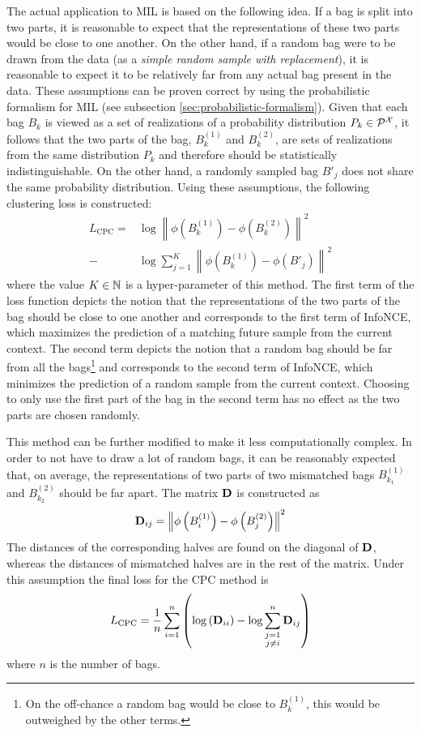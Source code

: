 The actual application to MIL is based on the following idea. If a bag is split into two parts, it is reasonable to expect that the representations of these two parts would be close to one another. On the other hand, if a random bag were to be drawn from the data (as a \textit{simple random sample with replacement}), it is reasonable to expect it to be relatively far from any actual bag present in the data. These assumptions can be proven correct by using the probabilistic formalism for MIL (see subsection \ref{sec:probabilistic-formalism}). Given that each bag \( B_k \) is viewed as a set of realizations of a probability distribution \( P_k \in \mathcal{P}^\mathspace{X} \), it follows that the two parts of the bag, \( B_k^{(1)} \) and \( B_k^{(2)} \), are sets of realizations from the same distribution \( P_k \) and therefore should be statistically indistinguishable. On the other hand, a randomly sampled bag \( B'_j \) does not share the same probability distribution.
Using these assumptions, the following clustering loss is constructed:
\begin{align*}
	L_\mathrm{CPC} = &\log \left\lVert \phi \left( B_k^{(1)} \right) - \phi \left( B_k^{(2)} \right) \right\rVert^2 \\
	- &\log \sum_{j = 1}^K \left\lVert \phi \left( B_k^{(1)} \right) - \phi \left( B'_j \right) \right\rVert^2
\end{align*}
where the value \( K \in \mathbb{N} \) is a hyper-parameter of this method. The first term of the loss function depicts the notion that the representations of the two parts of the bag should be close to one another and corresponds to the first term of InfoNCE, which maximizes the prediction of a matching future sample from the current context. The second term depicts the notion that a random bag should be far from all the bags\footnote{On the off-chance a random bag would be close to \( B_k^{(1)} \), this would be outweighed by the other terms.} and corresponds to the second term of InfoNCE, which minimizes the prediction of a random sample from the current context. Choosing to only use the first part of the bag in the second term has no effect as the two parts are chosen randomly.

This method can be further modified to make it less computationally complex. In order to not have to draw a lot of random bags, it can be reasonably expected that, on average, the representations of two parts of two mismatched bags \( B_{k_1}^{(1)} \) and \( B_{k_2}^{(2)} \) should be far apart. The matrix \( \mathbf{D} \) is constructed as
\begin{equation}\label{eq:bag-distance-matrix}
	\mathbf{D}_{ij} = \left\lVert \phi \left( B_i^{(1)} \right) - \phi \left( B_j^{(2)} \right) \right\rVert^2
\end{equation}
The distances of the corresponding halves are found on the diagonal of \( \mathbf{D} \), whereas the distances of mismatched halves are in the rest of the matrix. Under this assumption the final loss for the CPC method is
\[ L_\mathrm{CPC} = \frac{1}{n} \sum_{i = 1}^n \left( \log \left( \mathbf{D}_{ii} \right) - \log \sum_{\substack{j = 1 \\ j \neq i}}^n \mathbf{D}_{ij} \right) \]
where \( n \) is the number of bags.


